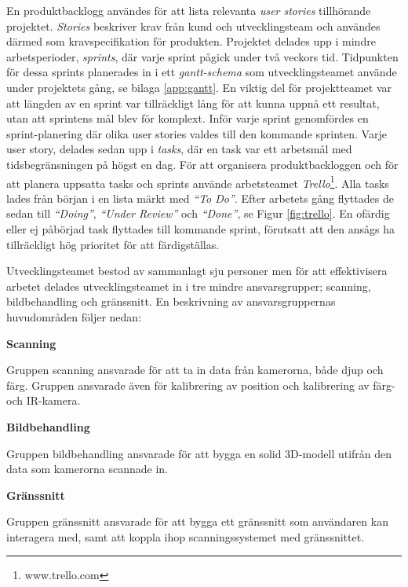 \documentclass[a4paper,12pt,oneside,final]{extbook}
\begin{document}
En produktbacklogg användes för att lista relevanta \emph{user stories} tillhörande projektet. \emph{Stories} beskriver krav från kund och utvecklingsteam och användes därmed som kravspecifikation för produkten. Projektet delades upp i mindre arbetsperioder, \emph{sprints}, där varje sprint pågick under två veckors tid. Tidpunkten för dessa sprints planerades in i ett \emph{gantt-schema} som utvecklingsteamet använde under projektets gång, se bilaga \ref{app:gantt}. En viktig del för projektteamet var att längden av en sprint var tillräckligt lång för att kunna uppnå ett resultat, utan att sprintens mål blev för komplext. Inför varje sprint  genomfördes en sprint-planering där olika user stories valdes till den kommande sprinten. Varje user story, delades sedan upp i \emph{tasks}, där en task var ett arbetsmål med tidsbegränsningen på högst en dag. För att organisera produktbackloggen och för att planera uppsatta tasks och sprints använde arbetsteamet \emph{Trello}\footnote{www.trello.com}. Alla tasks lades från början i en lista märkt med \emph{“To Do”}. Efter arbetets gång flyttades de sedan till \emph{“Doing”}, \emph{“Under Review”} och \emph{“Done”}, se Figur \ref{fig:trello}. En ofärdig eller ej påbörjad task flyttades till kommande sprint, förutsatt att den ansågs ha tillräckligt hög prioritet för att färdigställas.

Utvecklingsteamet bestod av sammanlagt sju personer men för att effektivisera arbetet delades utvecklingsteamet in i tre mindre ansvarsgrupper; scanning, bildbehandling och gränssnitt.
En beskrivning av ansvarsgruppernas huvudområden följer nedan:

\textbf{Scanning}

Gruppen scanning ansvarade för att ta in data från kamerorna, både djup och färg. Gruppen ansvarade även för kalibrering av position och kalibrering av färg- och IR-kamera.


\textbf{Bildbehandling}

Gruppen bildbehandling ansvarade för att bygga en solid 3D-modell utifrån den data som kamerorna scannade in.

\textbf{Gränssnitt}

Gruppen gränssnitt ansvarade för att bygga ett gränssnitt som användaren kan interagera med, samt att koppla ihop scanningssystemet med gränssnittet.
\end{document}
